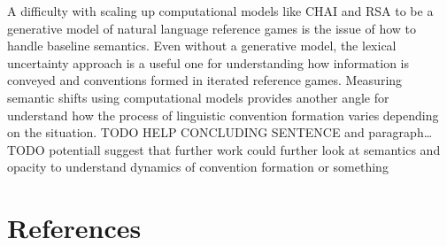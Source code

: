 \documentclass[10pt, letterpaper]{article}
\begin{document}
A difficulty with scaling up computational models like CHAI and RSA to
be a generative model of natural language reference games is the issue
of how to handle baseline semantics. Even without a generative model,
the lexical uncertainty approach is a useful one for understanding how
information is conveyed and conventions formed in iterated reference
games. Measuring semantic shifts using computational models provides
another angle for understand how the process of linguistic convention
formation varies depending on the situation. TODO HELP CONCLUDING
SENTENCE and paragraph\ldots{} TODO potentiall suggest that further work
could further look at semantics and opacity to understand dynamics of
convention formation or something

\section{References}\label{references}

\setlength{\parindent}{-0.1in} 
\setlength{\leftskip}{0.125in}

\noindent
\end{document}
